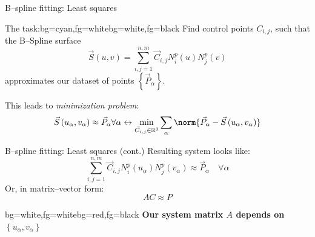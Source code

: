 \begin{frame}{B--spline fitting: Least squares}
\begin{variableblock}{The task:}{bg=cyan,fg=white}{bg=white,fg=black}
{
Find control points $C_{i,j}$, such that the B--Spline surface
\begin{equation*}
\vec{S}\left(u,v\right)=\sum\limits_{i,j=1}^{n,m} \vec{C}_{i,j} N_i^p\left(u\right) N_j^p\left(v\right)
\end{equation*}
approximates our dataset of points $\left\lbrace \vec{P}_{\alpha} \right\rbrace $. 
}
\end{variableblock}

This leads to \textit{minimization problem}:
\begin{equation*}
\vec{S}\left(u_\alpha,v_\alpha\right) \approx \vec{P}_{\alpha} \forall \alpha \leftrightarrow 
\underset{\vec{C}_{i,j}\in \mathbb{R}^3}{\min} \sum\limits_\alpha \norm{\vec{P}_{\alpha}-\vec{S}\left(u_\alpha,v_\alpha\right)}
\end{equation*}
\end{frame}

\begin{frame}{B--spline fitting: Least squares (cont.)}
Resulting system looks like:
\begin{equation*}
\sum\limits_{i,j=1}^{n,m} \vec{C}_{i,j} N_i^p\left(u_\alpha\right) N_j^p\left(v_\alpha\right) \approx \vec{P}_{\alpha} \quad \forall \alpha
\end{equation*}
Or, in matrix--vector form:
\begin{equation*}
A C \approx P
\end{equation*}


\begin{variableblock}{}{bg=white,fg=white}{bg=red,fg=black}
{
\textbf{
Our system matrix $A$ depends on $\left\lbrace u_\alpha,v_\alpha \right\rbrace$}
}
\end{variableblock}

\end{frame}

